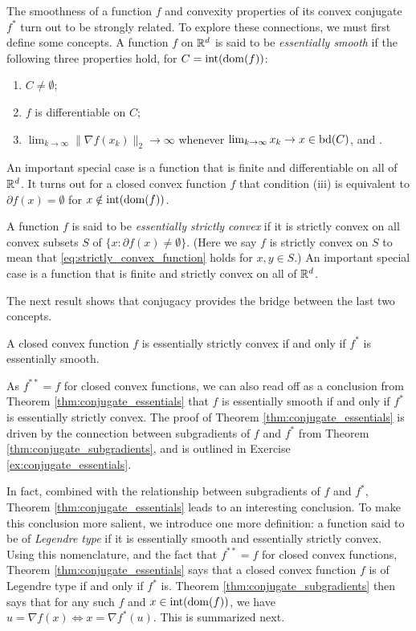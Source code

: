 The smoothness of a function $f$ and convexity properties of its convex
conjugate $f^*$ turn out to be strongly related. To explore these connections,
we must first define some concepts. A function $f$ on $\mathbb{R}^d$ is said to be
\emph{essentially smooth} if the following three properties hold, for $C =
\operatorname{int}(\operatorname{dom}(f))$:    
\begin{enumerate}[label=(\roman*)]
\item $C \not= \emptyset$;
\item $f$ is differentiable on $C$;
\item $\lim_{k \to \infty} \|\nabla f(x_k)\|_2 \to \infty$ whenever $\lim_{k \to
    \infty} x_k \to x \in \operatorname{bd}(C)$, and . 
\end{enumerate}
An important special case is a function that is finite and differentiable on all
of $\mathbb{R}^d$. It turns out for a closed convex function $f$ that condition (iii)
is equivalent to $\partial f(x) = \emptyset$ for $x \notin \operatorname{int}(\operatorname{dom}(f))$.   

A function $f$ is said to be \emph{essentially strictly convex} if it is
strictly convex on all convex subsets $S$ of $ \{x : \partial f(x) \not=
\emptyset\}$. (Here we say $f$ is strictly convex on $S$ to mean that
\eqref{eq:strictly_convex_function} holds for $x,y \in S$.) An important special 
case is a function that is finite and strictly convex on all of $\mathbb{R}^d$. 

The next result shows that conjugacy provides the bridge between the last two
concepts.  

\begin{Theorem}
\label{thm:conjugate_essentials}
A closed convex function $f$ is essentially strictly convex if and only if $f^*$
is essentially smooth. 
\end{Theorem}


As $f^{**} = f$ for closed convex functions, we can also read off as a
conclusion from Theorem \ref{thm:conjugate_essentials} that $f$ is essentially
smooth if and only if $f^*$ is essentially strictly convex. The proof of Theorem 
\ref{thm:conjugate_essentials} is driven by the connection between subgradients
of $f$ and $f^*$ from Theorem \ref{thm:conjugate_subgradients}, and is outlined
in Exercise \ref{ex:conjugate_essentials}.

In fact, combined with the relationship between subgradients of $f$ and $f^*$,
Theorem \ref{thm:conjugate_essentials} leads to an interesting conclusion. To
make this conclusion more salient, we introduce one more definition: a function
said to be of \emph{Legendre type} if it is essentially smooth and essentially
strictly convex. Using this nomenclature, and the fact that $f^{**} = f$ for
closed convex functions, Theorem \ref{thm:conjugate_essentials} says that a
closed convex function $f$ is of Legendre type if and only if $f^*$ is. Theorem
\ref{thm:conjugate_subgradients} then says that for any such $f$ and $x \in
\operatorname{int}(\operatorname{dom}(f))$, we have $u = \nabla f(x) \iff x = \nabla f^*(u)$. This is   
summarized next. 

